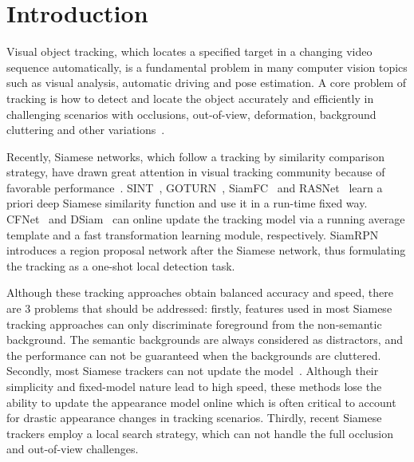\documentclass[runningheads]{llncs}
\begin{document}
\section{Introduction}

Visual object tracking, which locates a specified target in a changing video sequence automatically, is a fundamental problem in many computer vision topics such as visual analysis, automatic driving and pose estimation. A core problem of tracking is how to detect and locate the object accurately and efficiently in challenging scenarios with occlusions, out-of-view, deformation, background cluttering and other variations~\cite{OTB2015}.

Recently, Siamese networks, which follow a tracking by similarity comparison strategy, have drawn great attention in visual tracking community because of favorable performance~\cite{SINT,GOTURN,SiamFC,RASNet,CFNet,DSiam,EDCF,SiamRPN}. SINT~\cite{SINT}, GOTURN~\cite{GOTURN}, SiamFC~\cite{SiamFC} and RASNet~\cite{RASNet} learn a priori deep Siamese similarity function and use it in a run-time fixed way. CFNet~\cite{CFNet} and DSiam~\cite{DSiam} can online update the tracking model via a running average template and a fast transformation learning module, respectively. SiamRPN~\cite{SiamRPN} introduces a region proposal network after the Siamese network, thus formulating the tracking as a one-shot local detection task.

Although these tracking approaches obtain balanced accuracy and speed, there are 3 problems that should be addressed: firstly, features used in most Siamese tracking approaches can only discriminate foreground from the non-semantic background.
The semantic backgrounds are always considered as distractors, and the performance can not be guaranteed when the backgrounds are cluttered.
Secondly, most Siamese trackers can not update the model~\cite{SINT,GOTURN,SiamFC,RASNet,SiamRPN}. Although their simplicity and fixed-model nature lead to high speed, these methods lose the ability to update the appearance model online which is often critical to account for drastic appearance changes in tracking scenarios. Thirdly, recent Siamese trackers employ a local search strategy, which can not handle the full occlusion and out-of-view challenges.
\end{document}
